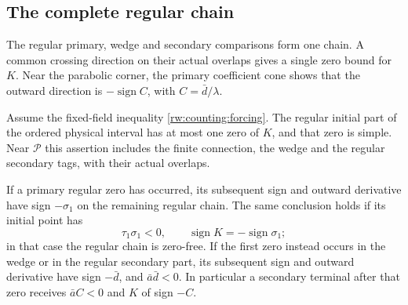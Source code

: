\subsection{The complete regular chain}

The regular primary, wedge and secondary comparisons form one chain.
A common crossing direction on their actual overlaps gives a single
zero bound for $K$. Near the parabolic corner, the primary coefficient
cone shows that the outward direction is $-\operatorname{sign}C$,
with $C=\bar d/\lambda$.

\begin{proposition}\label{rw:regular-chain}
Assume the fixed-field inequality \eqref{rw:counting:forcing}.
The regular initial part of the ordered physical interval has at
most one zero of $K$, and that zero is simple. Near $\mathcal P$
this assertion includes the finite connection, the wedge and the
regular secondary tags, with their actual overlaps.

If a primary regular zero has occurred, its subsequent sign and
outward derivative have sign $-\sigma_1$ on the remaining
regular chain. The same conclusion holds if its initial point
has
\begin{equation}\label{rw:merge:strong-entry}
 \tau_1\sigma_1<0,\qquad
 \operatorname{sign}K=-\operatorname{sign}\sigma_1;
\end{equation}
in that case the regular chain is zero-free.
If the first zero instead occurs in the wedge or in the regular
secondary part, its subsequent sign and outward derivative have
sign $-\bar d$, and $\bar a\bar d<0$.
In particular a secondary terminal after that zero receives
$\bar aC<0$ and $K$ of sign $-C$.
\end{proposition}
